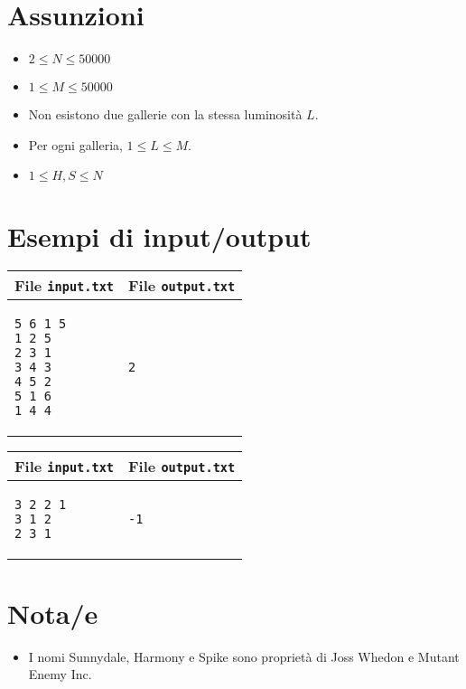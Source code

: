 \documentclass[a4paper,11pt]{article}
\begin{document}
  \section*{Assunzioni}
  \begin{itemize}
  
    \item $2 ≤ N ≤ 50000$
    \item $1 ≤ M ≤ 50000$
    \item Non esistono due gallerie con la stessa luminosità $L$.
    \item Per ogni galleria, $1 ≤ L ≤ M$.
    \item $1 ≤ H, S ≤ N$
  \end{itemize}

\section*{Esempi di input/output}

  
    \noindent
    \begin{tabular}{p{11cm}|p{5cm}}
    \toprule
    \textbf{File \texttt{input.txt}}
    & \textbf{File \texttt{output.txt}}
    \\
    \midrule
    \scriptsize
    \begin{verbatim}5 6 1 5
1 2 5
2 3 1
3 4 3
4 5 2
5 1 6
1 4 4\end{verbatim}
    &
    \scriptsize
    \begin{verbatim}2\end{verbatim}
    \\
    \bottomrule
    \end{tabular}
  
    \noindent
    \begin{tabular}{p{11cm}|p{5cm}}
    \toprule
    \textbf{File \texttt{input.txt}}
    & \textbf{File \texttt{output.txt}}
    \\
    \midrule
    \scriptsize
    \begin{verbatim}3 2 2 1
3 1 2
2 3 1\end{verbatim}
    &
    \scriptsize
    \begin{verbatim}-1\end{verbatim}
    \\
    \bottomrule
    \end{tabular}
  
\section*{Nota/e}
\begin{itemize}
  
    \item I nomi Sunnydale, Harmony e Spike sono proprietà di Joss Whedon e Mutant Enemy Inc.
\end{itemize}
\end{document}
